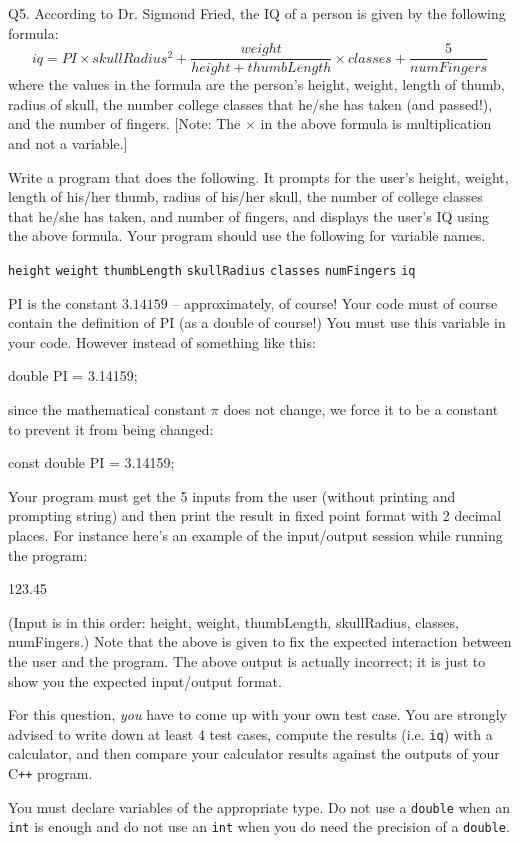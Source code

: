 Q5. According to Dr. Sigmond Fried, the IQ of a person is given by the following 
formula:
\[
iq = PI \times skullRadius^2 +
\frac{weight}{height + thumbLength}
\times classes +
\frac{5}{numFingers}
\]
where the values in the formula are the person's height, weight, length of thumb, radius of skull, the
number college classes that he/she has taken (and passed!), 
and the number of fingers. 
[Note: The $\times$ in the above formula is multiplication and not a variable.]

Write a program that does the following. It prompts for the user's height, 
weight, length of his/her
thumb, radius of his/her skull, the number of 
college classes that he/she has taken, and number of fingers,
and displays the
user's IQ using the above formula.
Your program should use the following for variable names.
\begin{tightlist}
\li \verb!height!
\li \verb!weight!
\li \verb!thumbLength!
\li \verb!skullRadius!
\li \verb!classes!
\li \verb!numFingers!
\li \verb!iq!
\end{tightlist}
PI is the constant $3.14159$  -- approximately, of course! 
Your code must of course contain the definition of PI 
(as a double of
course!) 
You must use this variable in your code.
However instead of something like this:
\begin{console}
double PI = 3.14159;
\end{console}
since the mathematical constant  $\pi$ does not change,
we force it to be a constant 
to prevent it from being changed:
\begin{console}
const double PI = 3.14159;
\end{console}


Your program must get the 5 inputs from the user 
(without printing and prompting string) and then print
the result in fixed point format with 2 decimal places. 
For instance here's an example of the
input/output session while running the program:
\begin{console}[commandchars=\\\{\}]
123.45
\end{console}
(Input is in this order: height, weight, thumbLength, skullRadius, classes, 
numFingers.) 
Note that the above is given to fix the expected interaction between the user 
and the program. 
The above output is actually incorrect; it is just to show you the
expected input/output format.

For this question, \textit{you} have to come up with your own test case.
You are strongly advised to write down at least 4 test cases, 
compute the results (i.e. \verb!iq!) with a
calculator, and then compare your calculator results against 
the outputs of your C\texttt{++} program.

You must declare variables of the appropriate type. 
Do not use a \verb!double! when an \verb!int! is enough and
do not use an \verb!int! when you do need the precision of a \verb!double!.
